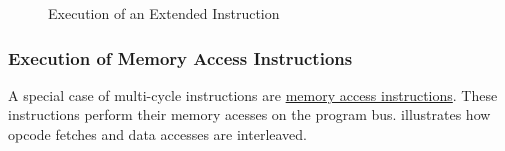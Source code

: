 \begin{figure}[!h]
\begin{center}
{{
    }
  }
  \caption{Execution of an Extended Instruction}
  \label{architecture:excyc:extended:fig}
  \end{center}
\end{figure}


\subsubsection{Execution of Memory Access Instructions}
\label{architecture:excyc:mem}

A special case of multi-cycle instructions are \hyperref[opcodes:memacc]{memory access instructions}.
These instructions perform their memory acesses on the program bus.
 illustrates how opcode fetches and data accesses are interleaved.

